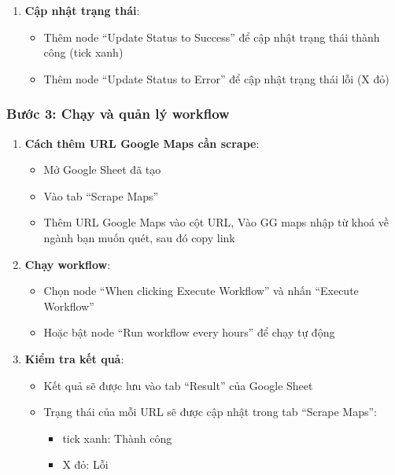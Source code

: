\begin{enumerate}
  \item \textbf{Cập nhật trạng thái}:
  \begin{itemize}
    \item Thêm node ``Update Status to Success'' để cập nhật trạng thái thành công (tick xanh)
    \item Thêm node ``Update Status to Error'' để cập nhật trạng thái lỗi (X đỏ)
  \end{itemize}
\end{enumerate}

\subsubsection{Bước 3: Chạy và quản lý workflow}

\begin{enumerate}
  \item \textbf{Cách thêm URL Google Maps cần scrape}:
  \begin{itemize}
    \item Mở Google Sheet đã tạo
    \item Vào tab ``Scrape Maps''
    \item Thêm URL Google Maps vào cột URL, Vào GG maps nhập từ khoá về ngành bạn muốn quét, sau đó copy link 
  \end{itemize}

  \item \textbf{Chạy workflow}:
  \begin{itemize}
    \item Chọn node ``When clicking Execute Workflow'' và nhấn ``Execute Workflow''
    \item Hoặc bật node ``Run workflow every hours'' để chạy tự động
  \end{itemize}

  \item \textbf{Kiểm tra kết quả}:
  \begin{itemize}
    \item Kết quả sẽ được lưu vào tab ``Result'' của Google Sheet
    \item Trạng thái của mỗi URL sẽ được cập nhật trong tab ``Scrape Maps'':
    \begin{itemize}
      \item tick xanh: Thành công
      \item X đỏ: Lỗi
    \end{itemize}
  \end{itemize}
\end{enumerate}

